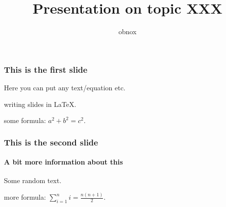 \documentclass[10pt]{beamer}
\title{Presentation on  topic XXX}
\author{obnox}
\begin{document}
    \maketitle
    \begin{frame}
	    \frametitle{This is the first slide}
		Here you can put any text/equation etc. 

        writing slides in \LaTeX.

        some formula: $a^2 + b^2 = c^2$.


    \end{frame}
	\begin{frame}
		\frametitle{This is the second slide}
		\framesubtitle{A bit more information about this}
		Some random text.		

        more formula: $\sum_{i=1}^{n}i = \frac{n(n+1)}{2}$.

    \end{frame}
\end{document}
